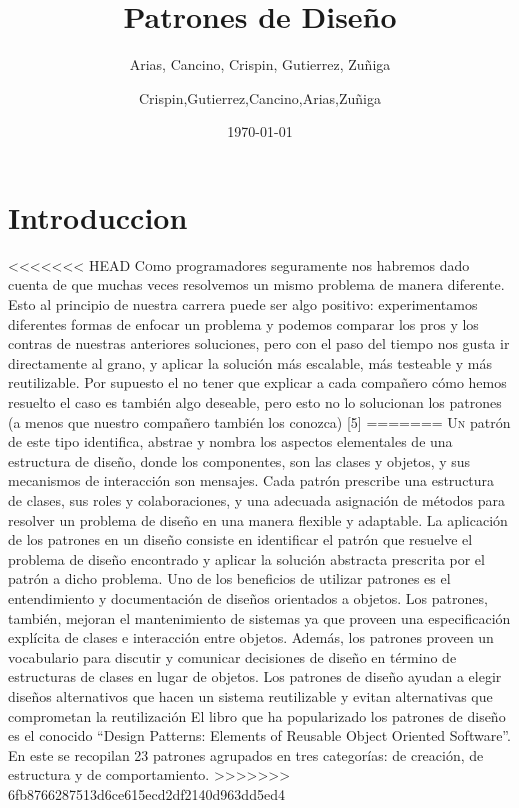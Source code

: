 \documentclass[twoside,twocolumn]{article}
\title{Patrones de Diseño} %
\author{Arias, Cancino, Crispin, Gutierrez, Zuñiga}
\author{Crispin,Gutierrez,Cancino,Arias,Zuñiga}
\date{\today} %
\begin{document}
\maketitle


\section{Introduccion}

<<<<<<< HEAD
\lettrine[nindent=0em,lines=3]{C}omo programadores seguramente nos habremos dado cuenta de que muchas veces resolvemos un mismo problema de manera diferente. Esto al principio de nuestra carrera puede ser algo positivo: experimentamos diferentes formas de enfocar un problema y podemos comparar los pros y los contras de nuestras anteriores soluciones, pero con el paso del tiempo nos gusta ir directamente al grano, y aplicar la solución más escalable, más testeable y más reutilizable. Por supuesto el no tener que explicar a cada compañero cómo hemos resuelto el caso es también algo deseable, pero esto no lo solucionan los patrones (a menos que nuestro compañero también los conozca) [5]
=======
\lettrine[nindent=0em,lines=3]{U}n patrón de este tipo identifica, abstrae y nombra los aspectos elementales de una estructura de diseño, donde los componentes, son las clases y objetos, y sus mecanismos de interacción son mensajes.  
Cada patrón prescribe una estructura de clases, sus roles y colaboraciones, y una adecuada asignación de métodos para resolver un problema de diseño en una manera flexible y adaptable.  
La aplicación de los patrones en un diseño consiste en identificar el patrón que resuelve el problema de diseño encontrado y aplicar la solución abstracta prescrita por el patrón a dicho problema. 
Uno de los beneficios de utilizar patrones es el entendimiento y documentación de diseños orientados a objetos. Los patrones, también, mejoran el mantenimiento de sistemas ya que proveen una especificación explícita de clases e interacción entre objetos. Además, los patrones proveen un vocabulario para discutir y comunicar decisiones de diseño en término de estructuras de clases en lugar de objetos.  
Los patrones de diseño ayudan a elegir diseños alternativos que hacen un sistema reutilizable y evitan alternativas que comprometan la reutilización  
El libro que ha popularizado los patrones de diseño es el conocido “Design Patterns: Elements of Reusable Object Oriented Software”. En este se recopilan 23 patrones agrupados en tres categorías: de creación, de estructura y de comportamiento.
>>>>>>> 6fb8766287513d6ce615ecd2df2140d963dd5ed4
\end{document}
